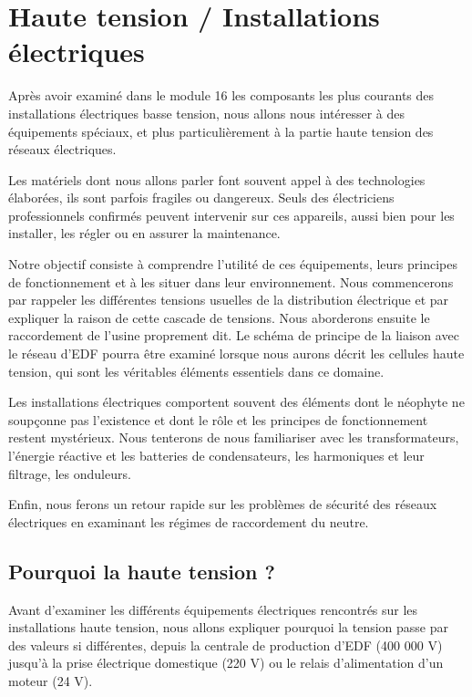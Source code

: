 \chapter{Haute tension / Installations électriques}

Après avoir examiné dans le module 16 les composants les plus courants des installations électriques basse tension, nous allons nous intéresser à des équipements spéciaux, et plus particulièrement à la partie haute tension des réseaux électriques.
\vspace{0.3cm}

Les matériels dont nous allons parler font souvent appel à des technologies élaborées, ils sont parfois fragiles ou dangereux. Seuls des électriciens professionnels confirmés peuvent intervenir sur ces appareils, aussi bien pour les installer, les régler ou en assurer la maintenance.
\vspace{0.3cm}

Notre objectif consiste à comprendre l’utilité de ces équipements, leurs principes de fonctionnement et à les situer dans leur environnement. Nous commencerons par rappeler les différentes tensions usuelles de la distribution électrique et par expliquer la raison de cette cascade de tensions.
Nous aborderons ensuite le raccordement de l’usine proprement dit. Le schéma de principe de la liaison avec le réseau d’EDF pourra être examiné lorsque nous aurons décrit les cellules haute tension, qui sont les véritables éléments essentiels dans ce domaine.
\vspace{0.3cm}


Les installations électriques comportent souvent des éléments dont le néophyte ne soupçonne pas l’existence et dont le rôle et les principes de fonctionnement restent mystérieux. Nous tenterons de nous familiariser avec les transformateurs, l’énergie réactive et les batteries de condensateurs, les harmoniques et leur filtrage, les onduleurs.

\vspace{0.3cm}

Enfin, nous ferons un retour rapide sur les problèmes de sécurité des réseaux électriques en examinant les régimes de raccordement du neutre.


\section{Pourquoi la haute tension ?}

Avant d’examiner les différents équipements électriques rencontrés sur les installations haute tension, nous allons expliquer pourquoi la tension passe par des valeurs si différentes, depuis la centrale de production d’EDF (400 000 V) jusqu’à la prise électrique domestique (220 V) ou le relais d’alimentation d’un moteur (24 V).


